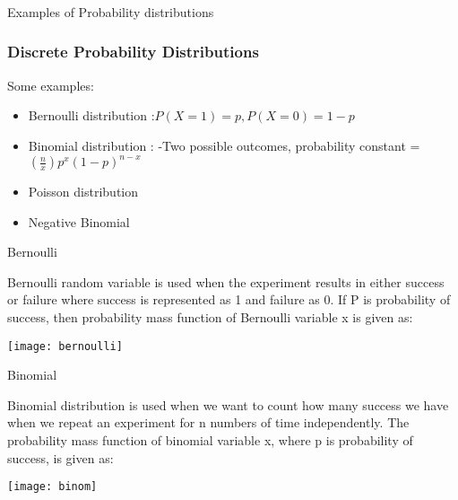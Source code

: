 \begin{frame}[fragile]\frametitle{}
\begin{center}
{\Large Examples of Probability distributions}
\end{center}
\end{frame}


\begin{frame}
\frametitle{Discrete Probability Distributions }
Some examples:
\begin{itemize}
\item Bernoulli distribution :$ P(X = 1) = p,           P(X = 0) = 1- p$
 
\item Binomial distribution : -Two possible outcomes, probability constant = $(\frac{n}{x})p^x (1-p)^{n-x}$
 
\item Poisson distribution 
 
\item Negative Binomial 
\end{itemize}
\end{frame}

\begin{frame}{Bernoulli}

Bernoulli random variable is used when the experiment results in
either success or failure where success is represented as 1 and failure as
0. If P is probability of success, then probability mass function of
Bernoulli variable x is given as:

\begin{center}
\texttt{[image: bernoulli]}
\end{center}
\end{frame}

\begin{frame}{Binomial}

Binomial distribution is used when we want to count how many success we
have when we repeat an experiment for n numbers of time
independently. The probability mass function of binomial variable x,
where p is probability of success, is given as:

\begin{center}
\texttt{[image: binom]}
\end{center}
\end{frame}

